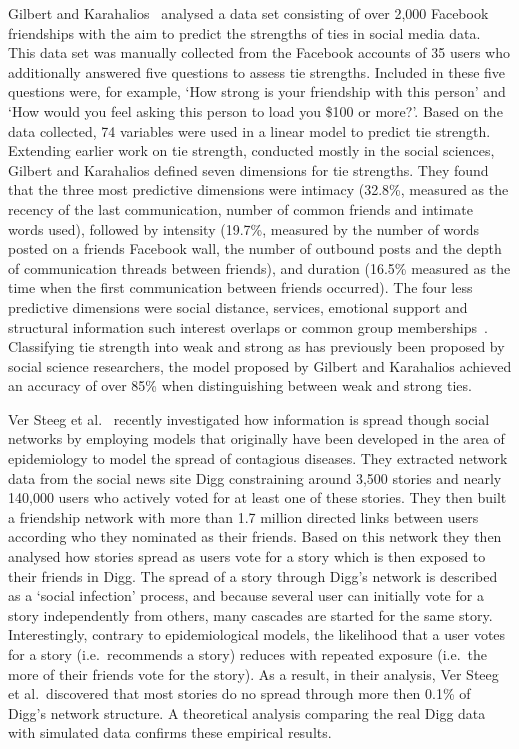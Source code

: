 \documentclass[letterpaper]{article}
\begin{document}
Gilbert and Karahalios~\cite{gilbert2009predicting} analysed a data set consisting of over 2,000 Facebook friendships with the aim to predict the strengths of ties in social media data. This data set was manually collected from the Facebook accounts of 35 users who additionally answered five questions to assess tie strengths. Included in these five questions were, for example, `How strong is your friendship with this person' and `How would you feel asking this person to load you \$100 or more?'. Based on the data collected, 74 variables were used in a linear model to predict tie strength. Extending earlier work on tie strength, conducted mostly in the social sciences, Gilbert and Karahalios defined seven dimensions for tie strengths. They found that the three most predictive dimensions were intimacy (32.8\%, measured as the recency of the last communication, number of common friends and intimate words used), followed by intensity (19.7\%, measured by the number of words posted on a friends Facebook wall, the number of outbound posts and the depth of communication threads between friends), and duration (16.5\% measured as the time when the first communication between friends occurred). The four less predictive dimensions were social distance, services, emotional support and structural information such interest overlaps or common group memberships~\cite{gilbert2009predicting}. Classifying tie strength into weak and strong as has previously been proposed by social science researchers, the model proposed by Gilbert and Karahalios achieved an accuracy of over 85\% when distinguishing between weak and strong ties.




Ver Steeg et al.~\cite{ver2011stops} recently investigated how information is spread though social networks by employing models that originally have been developed in the area of epidemiology to model the spread of contagious diseases. They extracted network data from the social news site Digg constraining around 3,500 stories and nearly 140,000 users who actively voted for at least one of these stories. They then built a friendship network with more than 1.7 million directed links between users according who they nominated as their friends. Based on this network they then analysed how stories spread as users vote for a story which is then exposed to their friends in Digg. The spread of a story through Digg's network is described as a `social infection' process, and because several user can initially vote for a  story independently from others, many cascades are started for the same story. Interestingly, contrary to epidemiological models, the likelihood that a user votes for a story (i.e.\ recommends a story) reduces with repeated exposure (i.e.\ the more of their friends vote for the story). As a result, in their analysis, Ver Steeg et al.\ discovered that most stories do no spread through more then 0.1\% of Digg's network structure. A theoretical analysis comparing the real Digg data with simulated data confirms these empirical results.
\end{document}
